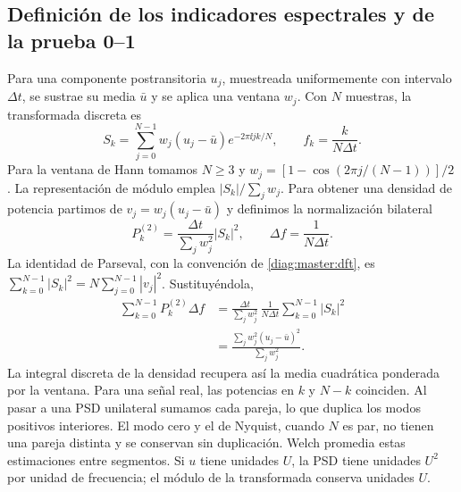\subsection{Definición de los indicadores espectrales y de la prueba 0--1}
\label{diag:master:definition}

Para una componente postransitoria $u_j$, muestreada uniformemente con
intervalo $\Delta t$, se sustrae su media $\bar u$ y se aplica una ventana
$w_j$. Con $N$ muestras, la transformada discreta es
\begin{equation}
 S_k=\sum_{j=0}^{N-1}w_j(u_j-\bar u)e^{-2\pi\ii jk/N},
 \qquad f_k=\frac{k}{N\Delta t}.
 \label{diag:master:dft}
\end{equation}
Para la ventana de Hann tomamos \(N\geq3\) y
\(w_j=[1-\cos(2\pi j/(N-1))]/2\). La representación de módulo emplea
\(|S_k|/\sum_jw_j\). Para obtener una densidad de potencia partimos de
\(v_j=w_j(u_j-\bar u)\) y definimos la normalización bilateral
\[
 P_k^{(2)}=\frac{\Delta t}{\sum_jw_j^2}|S_k|^2,
 \qquad \Delta f=\frac1{N\Delta t}.
\]
La identidad de Parseval, con la convención de
\cref{diag:master:dft}, es
\(\sum_{k=0}^{N-1}|S_k|^2=N\sum_{j=0}^{N-1}|v_j|^2\). Sustituyéndola,
\begin{align*}
 \sum_{k=0}^{N-1}P_k^{(2)}\Delta f
 &=\frac{\Delta t}{\sum_jw_j^2}\,
   \frac1{N\Delta t}\sum_{k=0}^{N-1}|S_k|^2\\
 &=\frac{\sum_jw_j^2(u_j-\bar u)^2}{\sum_jw_j^2}.
\end{align*}
La integral discreta de la densidad recupera así la media cuadrática
ponderada por la ventana. Para una señal real, las potencias en \(k\) y
\(N-k\) coinciden. Al pasar a una PSD unilateral sumamos cada pareja,
lo que duplica los modos positivos interiores. El modo cero y el de
Nyquist, cuando \(N\) es par, no tienen una pareja distinta y se conservan
sin duplicación. Welch promedia estas estimaciones entre segmentos.
Si \(u\) tiene unidades \(U\), la PSD tiene unidades \(U^2\) por unidad
de frecuencia; el módulo de la transformada conserva unidades \(U\).

